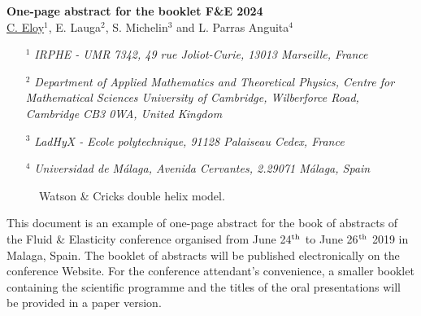\documentclass[a4,fullpage,twoside,12pt]{report}
\newcommand{\sst}[1]{\scriptscriptstyle{#1}}
\begin{document}
\setcounter{footnote}{0}
%
\vspace*{1.5cm}
\begin{center}
%
\textsf{\bfseries \Large One-page abstract for the booklet F\&E 2024}\\[5mm]
%
\large
\underline{C. Eloy$^{\sst 1}$}, E. Lauga$^{\sst 2}$, S. Michelin$^{\sst 3}$ and L. Parras Anguita$^{4}$\\[5mm]%
%
\end{center}
\small
%
\begin{enumerate}
\item[$^{\sst 1}\!\!$]\emph{IRPHE - UMR 7342, 49 rue Joliot-Curie, 13013 Marseille, France}
\item[$^{\sst 2}\!\!$]\emph{Department of Applied Mathematics and Theoretical Physics, Centre for Mathematical Sciences
University of Cambridge, Wilberforce Road, Cambridge CB3 0WA, United Kingdom}
\item[$^{\sst 3}\!\!$]\emph{LadHyX - Ecole polytechnique, 91128 Palaiseau Cedex, France}
\item[$^{\sst 4}\!\!$]\emph{Universidad de M\'alaga, Avenida Cervantes, 2.29071 M\'alaga, Spain}\\[5mm]
\end{enumerate}
%
\normalsize
%
\begin{figure}
\vspace*{-12pt}
\caption*{Watson \& Cricks double helix model.\label{fig:O2}}
\vspace*{-12pt}
\end{figure}

This document is an example of one-page abstract for the book of abstracts
of the Fluid \& Elasticity conference organised from June 24$^{\mbox{\scriptsize th}}$ 
to June 26$^{\mbox{\scriptsize th}}$ 2019 in Malaga, Spain.
The booklet of abstracts will be published electronically on the conference Website. 
For the conference attendant's convenience, a smaller booklet containing the scientific programme and 
the titles of the oral presentations will be provided in a paper version.
\end{document}
